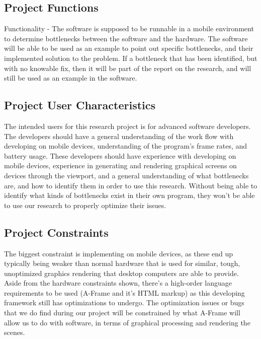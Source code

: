 \documentclass[letterpaper,10pt,titlepage,draftclsnofoot,onecolumn,compsoc,utf8,latin1]{IEEEtran}
\begin{document}
\subsection{Project Functions}
\begin{singlespace}
\noindent
Functionality - The software is supposed to be runnable in a mobile environment to determine bottlenecks between the software and the hardware. The software will be able to be used as an example to point out specific bottlenecks, and their implemented solution to the problem. If a bottleneck that has been identified, but with no knowable fix, then it will be part of the report on the research, and will still be used as an example in the software.
\end{singlespace}

\subsection{Project User Characteristics}
\begin{singlespace}
\noindent
The intended users for this research project is for advanced software developers. The developers should have a general understanding of the work flow with developing on mobile devices, understanding of the program's frame rates, and battery usage. These developers should have experience with developing on mobile devices, experience in generating and rendering graphical screens on devices through the viewport, and a general understanding of what bottlenecks are, and how to identify them in order to use this research. Without being able to identify what kinds of bottlenecks exist in their own program, they won't be able to use our research to properly optimize their issues.
\end{singlespace}

\subsection{Project Constraints}
\begin{singlespace}
\noindent
The biggest constraint is implementing on mobile devices, as these end up typically being weaker than normal hardware that is used for similar, tough, unoptimized graphics rendering that desktop computers are able to provide. Aside from the hardware constraints shown, there's a high-order language requirements to be used (A-Frame and it's HTML markup) as this developing framework still has optimizations to undergo. The optimization issues or bugs that we do find during our project will be constrained by what A-Frame will allow us to do with software, in terms of graphical processing and rendering the scenes.
\end{singlespace}
\end{document}
